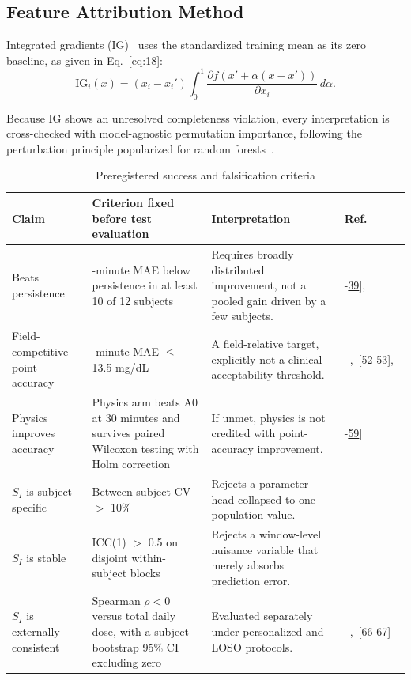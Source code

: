 \documentclass[journal]{IEEEtran}
\begin{document}
\subsection{Feature Attribution Method}

Integrated gradients (IG)~\cite{ref54} uses the standardized training mean as its zero baseline, as given in Eq.~\eqref{eq:18}:
\begin{equation}
\text{IG}_i(x) = (x_i - x_i') \int_0^1 \frac{\partial f(x' + \alpha(x - x'))}{\partial x_i}\, d\alpha.
\label{eq:18}
\end{equation}

Because IG shows an unresolved completeness violation, every interpretation is cross-checked with model-agnostic permutation importance, following the perturbation principle popularized for random forests~\cite{ref55}.

\begin{table}[t]
\centering
\caption{Preregistered success and falsification criteria}
\label{tab:falsification}
\footnotesize
\begin{tabular}{>{\raggedright\arraybackslash}p{2.6cm}>{\raggedright\arraybackslash}p{5.6cm}>{\raggedright\arraybackslash}p{5.8cm}>{\raggedright\arraybackslash}p{2.4cm}}
\toprule
Claim & Criterion fixed before test evaluation & Interpretation & Ref. \\
\midrule
Beats persistence & 30-minute MAE below persistence in at least 10 of 12 subjects & Requires broadly distributed improvement, not a pooled gain driven by a few subjects. & [\hyperref[ref30label]{38}-\hyperref[ref31label]{39}],~\cite{ref57} \\
Field-competitive point accuracy & 30-minute MAE $\leq$ 13.5 mg/dL & A field-relative target, explicitly not a clinical acceptability threshold. &~\cite{ref31},~[\hyperref[ref43label]{52}-\hyperref[ref44label]{53}],~\cite{ref64} \\
Physics improves accuracy & Physics arm beats A0 at 30 minutes and survives paired Wilcoxon testing with Holm correction & If unmet, physics is not credited with point-accuracy improvement. & [\hyperref[ref48label]{58}-\hyperref[ref49label]{59}] \\
$S_I$ is subject-specific & Between-subject CV $>$ 10\% & Rejects a parameter head collapsed to one population value. &~\cite{ref1,ref32} \\
$S_I$ is stable & ICC(1) $>$ 0.5 on disjoint within-subject blocks & Rejects a window-level nuisance variable that merely absorbs prediction error. &~\cite{ref50,ref76} \\
$S_I$ is externally consistent & Spearman $\rho < 0$ versus total daily dose, with a subject-bootstrap 95\% CI excluding zero & Evaluated separately under personalized and LOSO protocols. &~\cite{ref51},~[\hyperref[ref77label]{66}-\hyperref[ref78label]{67}] \\
\bottomrule
\end{tabular}
\end{table}
\end{document}
